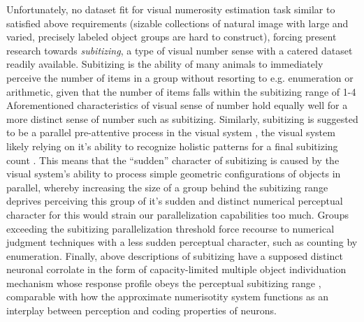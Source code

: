 \documentclass[twocolumn]{article}
\begin{document}
Unfortunately, no dataset fit for visual numerosity estimation task
similar to \citet{stoianov2012} satisfied above requirements (sizable
collections of natural image with large and varied, precisely labeled
object groups are hard to construct), forcing present research towards
\emph{subitizing}, a type of visual number sense with a catered
dataset readily available. Subitizing is the ability of many animals to
immediately perceive the number of items in a group without resorting to e.g. enumeration or arithmetic, given that the number of items falls within the
subitizing range of 1-4 \citep{kaufman1949, animalsnumericalcognition}
Aforementioned characteristics of visual sense of
number hold equally well for a more distinct sense of number such as
subitizing. Similarly, subitizing is suggested to be a parallel
pre-attentive process in the visual system
\citep[p.~57]{dehaene2011number}, the visual system likely relying on
it's ability to recognize holistic patterns for a final subitizing count
\citetext{\citealp{jansen2014role}; \citealp[p.~57]{dehaene2011number}; \citealp{piazza2002subitizing}}.
This means that the ``sudden'' character of subitizing is caused by the
visual system's ability to process simple geometric configurations of
objects in parallel, whereby increasing the size of a group behind the
subitizing range deprives perceiving this group of it's sudden and
distinct numerical perceptual character for this would strain our
parallelization capabilities too much. Groups exceeding the subitizing parallelization threshold force recourse to numerical judgment techniques with a less sudden perceptual character, such as counting by enumeration. Finally, above descriptions of subitizing have a supposed distinct neuronal corrolate in the form of capacity-limited multiple object individuation mechanism whose response profile obeys the perceptual subitizing range \citep{poncet2016individuation}, comparable with how the approximate numerisotity system functions as an interplay between perception and coding properties of neurons.\\
\end{document}
